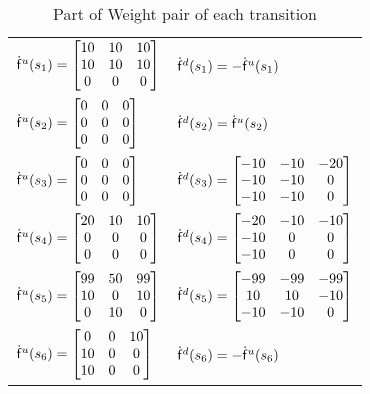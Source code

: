 \documentclass[10pt, conference, compsocconf]{IEEEtran}
\begin{document}
\begin{table}[h]
\scriptsize
\centering
\caption{\label{rewardcost} Part of Weight pair of each transition}
\begin{tabular}{ll}\hline
${\sf \dot{f}}^u(s_1)=\begin{bmatrix}10&10&10 \\10&10&10 \\0&0&0\end{bmatrix}$           &${\sf \dot{f}}^d(s_1)=-{\sf \dot{f}}^u(s_1)$  \\
${\sf \dot{f}}^u(s_2)=\begin{bmatrix}0&0&0 \\0&0&0 \\0&0&0\end{bmatrix}$                 &${\sf \dot{f}}^d(s_2)={\sf \dot{f}}^u(s_2)$   \\
${\sf \dot{f}}^u(s_3)=\begin{bmatrix}0&0&0 \\0&0&0 \\0&0&0\end{bmatrix}$                 &${\sf \dot{f}}^d(s_3)=\begin{bmatrix}-10&-10&-20 \\-10&-10&0 \\-10&-10&0\end{bmatrix}$\\
${\sf \dot{f}}^u(s_4)=\begin{bmatrix}20&10&10 \\0&0&0 \\0&0&0\end{bmatrix}$              &${\sf \dot{f}}^d(s_4)=\begin{bmatrix}-20&-10&-10 \\-10&0&0 \\-10&0&0\end{bmatrix}$\\
${\sf \dot{f}}^u(s_5)=\begin{bmatrix}99&50&99 \\10&0&10 \\0&10&0\end{bmatrix}$          &${\sf \dot{f}}^d(s_5)=\begin{bmatrix}-99&-99&-99 \\10&10&-10 \\-10&-10&0\end{bmatrix}$\\
${\sf \dot{f}}^u(s_6)=\begin{bmatrix}0&0&10 \\10&0&0 \\10&0&0\end{bmatrix}$          &${\sf \dot{f}}^d(s_6)=-{\sf \dot{f}}^u(s_6)$\\
\hline
\end{tabular}
\end{table}
\end{document}
